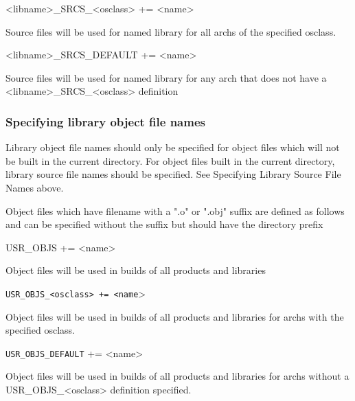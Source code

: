\begin{description}\item \textless{}libname\textgreater{}\_SRCS\_\textless{}osclass\textgreater{} += \textless{}name\textgreater{}

\end{description}Source files will be used for named library for all archs of the specified osclass.

\begin{description}\item \textless{}libname\textgreater{}\_SRCS\_DEFAULT += \textless{}name\textgreater{}

\end{description}Source files will be used for named library for any arch that does not have a \textless{}libname\textgreater{}\_SRCS\_\textless{}osclass\textgreater{} 
definition

\subsubsection{Specifying library object file names}

Library object file names should only be specified for object files which will not be built in the current directory. For 
object files built in the current directory, library source file names should be specified. See Specifying Library Source File 
Names above.

Object files which have filename with a ".o" or ".obj" suffix are defined as follows and can be specified without the suffix 
but should have the directory prefix 

\begin{description}\item {}USR\_OBJS += \textless{}name\textgreater{}

\end{description}Object files will be used in builds of all products and libraries

\begin{description}\item \verb|USR_OBJS_<osclass> += <name|\textgreater{}

\end{description}Object files will be used in builds of all products and libraries for archs with the specified osclass.

\begin{description}\item \verb|USR_OBJS_DEFAULT| += \textless{}name\textgreater{}

\end{description}Object files will be used in builds of all products and libraries for archs without a USR\_OBJS\_\textless{}osclass\textgreater{} 
definition specified.

